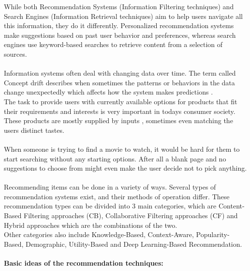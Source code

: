 \documentclass[\myFontSize,oneside,english,hidelinks,a4paper]{article}
\begin{document}
%
While both Recommendation Systems (Information Filtering techniques) and Search Engines (Information Retrieval techniques) aim to help users navigate all this information, they do it differently. Personalized recommendation systems make suggestions based on past user behavior and preferences, whereas search engines use keyword-based searches to retrieve content from a selection of sources.\\\\
%
Information systems often deal with changing data over time. The term called Concept drift describes when sometimes the patterns or behaviors in the data change unexpectedly which affects how the system makes predictions \cite{Sun2024}.\\
The task to provide users with currently available options for products that fit their requirements and interests is very important in todays consumer society. These products are mostly supplied by inputs \cite{Philip2014} , sometimes even matching the users distinct tastes.\\\\
%
When someone is trying to find a movie to watch, it would be hard for them to start searching without any starting options. After all a blank page and no suggestions to choose from might even make the user decide not to pick anything. \\\\
%
Recommending items can be done in a variety of ways. Several types of recommendation systems exist, and their methods of operation differ. These recommendation types can be divided into 3 main categories, which are Content-Based Filtering approaches (CB), Collaborative Filtering approaches (CF) and Hybrid approaches which are the combinations of the two. \\
Other categories also include Knowledge-Based, Context-Aware, Popularity-Based, Demographic, Utility-Based and Deep Learning-Based Recommendation.\\\\
%
%
\textbf{Basic ideas of the recommendation techniques:}
\end{document}
